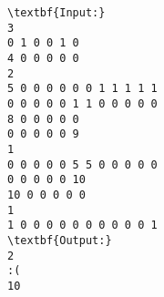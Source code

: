 \begin{verbatim}
\textbf{Input:}
3
0 1 0 0 1 0 
4 0 0 0 0 0
2
5 0 0 0 0 0 0 1 1 1 1 1
0 0 0 0 0 1 1 0 0 0 0 0
8 0 0 0 0 0
0 0 0 0 0 9
1
0 0 0 0 0 5 5 0 0 0 0 0
0 0 0 0 0 10
10 0 0 0 0 0
1
1 0 0 0 0 0 0 0 0 0 0 1
\textbf{Output:}
2
:(
10\end{verbatim}
